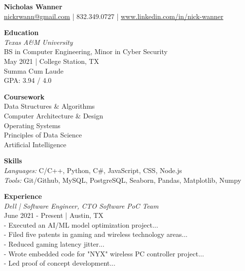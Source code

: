 \documentclass[11pt]{article}
\begin{document}
\noindent\textbf{Nicholas Wanner} \\
\href{mailto:nickrwann@gmail.com}{nickrwann@gmail.com} | 832.349.0727 | \href{https://www.linkedin.com/in/nick-wanner}{www.linkedin.com/in/nick-wanner}

\vspace{2mm}

\noindent\textbf{Education} \\
\textit{Texas A\&M University} \\
BS in Computer Engineering, Minor in Cyber Security \\
May 2021 | College Station, TX \\
Summa Cum Laude \\
GPA: 3.94 / 4.0

\vspace{2mm}

\noindent\textbf{Coursework} \\
Data Structures \& Algorithms \\
Computer Architecture \& Design \\
Operating Systems \\
Principles of Data Science \\
Artificial Intelligence

\vspace{2mm}

\noindent\textbf{Skills} \\
\textit{Languages:} C/C++, Python, C\#, JavaScript, CSS, Node.js \\
\textit{Tools:} Git/Github, MySQL, PostgreSQL, Seaborn, Pandas, Matplotlib, Numpy

\vspace{2mm}

\noindent\textbf{Experience} \\
\textit{Dell | Software Engineer, CTO Software PoC Team} \\
June 2021 - Present | Austin, TX \\
- Executed an AI/ML model optimization project... \\
- Filed five patents in gaming and wireless technology areas... \\
- Reduced gaming latency jitter... \\
- Wrote embedded code for "NYX" wireless PC controller project... \\
- Led proof of concept development...

\vspace{2mm}
\end{document}
